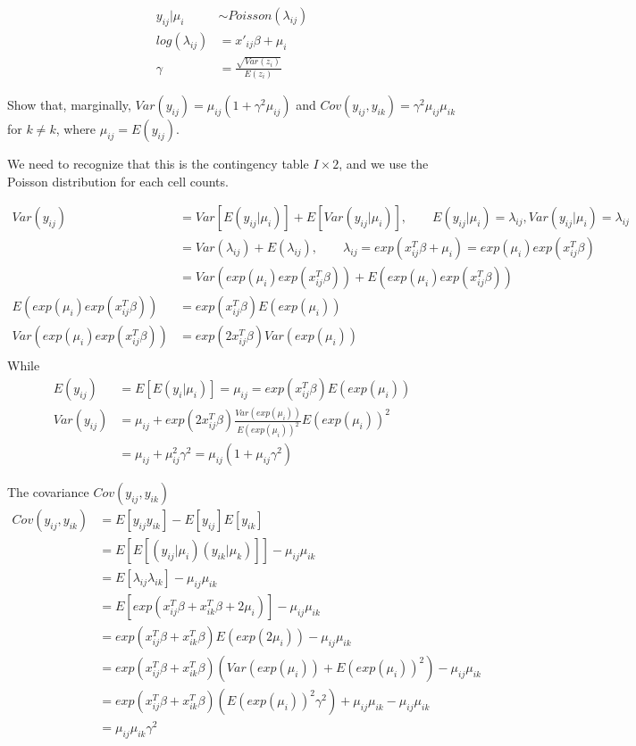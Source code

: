 \documentclass[11pt]{article} %
\begin{document}
\begin{align*}
	y_{ij}|\mu_i & \sim Poisson (\lambda_{ij})\\
    log (\lambda_{ij}) &= x'_{ij} \beta + \mu_i\\
    \gamma &= \frac{\sqrt{Var(z_i)}}{E(z_i)}
\end{align*}

Show that, marginally, $Var(y_{ij}) = \mu_{ij} (1+ \gamma^2 \mu_{ij})$ and $Cov(y_{ij}, y_{ik}) = \gamma^2 \mu_{ij}\mu_{ik}$ for $k \neq k$, where $\mu_{ij} = E(y_{ij})$.

We need to recognize that this is the contingency table $I \times 2$, and we use the Poisson distribution for each cell counts.

\begin{align*}
    Var(y_{ij}) &= Var[E(y_{ij}|\mu_i)] + E[Var(y_{ij}|\mu_{i})], \qquad E(y_{ij}|\mu_i) = \lambda_{ij}, Var(y_{ij}|\mu_i) = \lambda_{ij}\\
    &= Var(\lambda_{ij}) +E(\lambda_{ij}), \qquad \lambda_{ij} = exp(x^T_{ij} \beta + \mu_i) = exp(\mu_i) exp(x^T_{ij} \beta)\\
    &= Var( exp(\mu_i) exp(x^T_{ij} \beta)) + E( exp(\mu_i) exp(x^T_{ij} \beta)) \\
   E( exp(\mu_i) exp(x^T_{ij} \beta)) &= exp(x^T_{ij} \beta) E(exp(\mu_i))\\
   Var( exp(\mu_i) exp(x^T_{ij} \beta)) &= exp(2 x^T_{ij}\beta) Var(exp(\mu_i))\\
\end{align*}
While
\begin{align*}
	E(y_{ij}) &= E[E(y_i|\mu_i)] = \mu_{ij} = exp(x^T_{ij} \beta) E(exp(\mu_i))\\
	Var(y_{ij}) &= \mu_{ij} + exp(2 x^T_{ij}\beta) \frac{Var(exp(\mu_i))}{E(exp(\mu_i))^2} E(exp(\mu_i))^2\\
	&= \mu_{ij} + \mu_{ij}^2 \gamma^2 = \mu_{ij} (1+ \mu_{ij}\gamma^2)
\end{align*}

The covariance $Cov(y_{ij}, y_{ik})$
\begin{align*}
	Cov(y_{ij}, y_{ik}) &= E[y_{ij} y_{ik}] - E[y_{ij}] E[y_{ik}]\\
	&= E[E[(y_{ij}|\mu_i) (y_{ik}|\mu_k)]] - \mu_{ij} \mu_{ik} \\
	& =E[\lambda_{ij} \lambda_{ik}] - \mu_{ij} \mu_{ik} \\
	&= E[exp(x_{ij}^T \beta + x_{ik}^T \beta + 2\mu_i) ] - \mu_{ij} \mu_{ik} \\
	&= exp(x_{ij}^T \beta + x_{ik}^T \beta) E(exp(2 \mu_i)) - \mu_{ij} \mu_{ik}\\
	&= exp(x_{ij}^T \beta + x_{ik}^T \beta) (Var(exp(\mu_i)) + E(exp(\mu_i))^2 ) - \mu_{ij} \mu_{ik}\\
	&= exp(x_{ij}^T \beta + x_{ik}^T \beta) (E(exp(\mu_i))^2 \gamma^2) + \mu_{ij}\mu_{ik} - \mu_{ij} \mu_{ik}\\
	&= \mu_{ij}\mu_{ik} \gamma^2
\end{align*}
\end{document}
